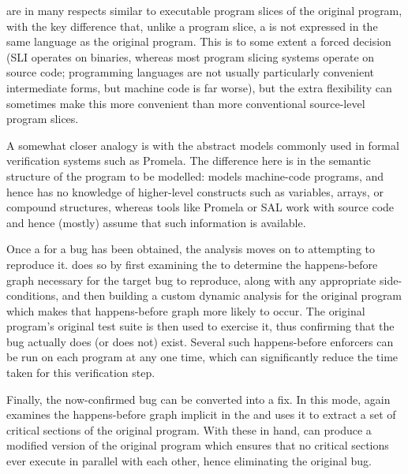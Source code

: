 \STateMachines are in many respects similar to executable program
slices of the original program, with the key difference that, unlike a
program slice, a \StateMachine is not expressed in the same language
as the original program.  This is to some extent a forced decision
(SLI operates on binaries, whereas most program slicing systems
operate on source code; programming languages are not usually
particularly convenient intermediate forms, but machine code is far
worse), but the extra flexibility can sometimes make this more
convenient than more conventional source-level program
slices.

A somewhat closer analogy is with the abstract models commonly used in
formal verification systems such as Promela\needCite{}.  The
difference here is in the semantic structure of the program to be
modelled: \technique{} models machine-code programs, and hence has no
knowledge of higher-level constructs such as variables, arrays, or
compound structures, whereas tools like Promela or SAL\needCite{} work
with source code and hence (mostly) assume that such information is
available.

Once a {\StateMachine} for a bug has been obtained, the analysis moves
on to attempting to reproduce it.  {\Technique} does so by first
examining the {\StateMachine} to determine the happens-before graph
necessary for the target bug to reproduce, along with any appropriate
side-conditions, and then building a custom dynamic analysis for the
original program which makes that happens-before graph more likely to
occur.  The
original program's original test suite is then used to exercise it,
thus confirming that the bug actually does (or does not) exist.
Several such happens-before enforcers can be run on each program at
any one time, which can significantly reduce the time taken for this
verification step.

Finally, the now-confirmed bug can be converted into a fix.  In this
mode, {\technique} again examines the happens-before graph implicit in
the {\StateMachine} and uses it to extract a set of critical sections
of the original program.  With these in hand, {\technique} can produce
a modified version of the original program which ensures that no
critical sections ever execute in parallel with each other, hence
eliminating the original bug.


